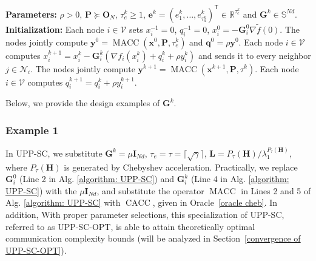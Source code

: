 \documentclass[12pt,draftcls,onecolumn]{IEEEtran}
\renewcommand{\Re}{{\mathbb{R}}}
\newcommand{\bG}{{\mathbf{G}}}
\newcommand{\bI}{{\mathbf{I}}}
\begin{document}
\begin{algorithm}[h]
	\renewcommand{\thealgorithm}{3}
	\caption{UPP-SC}
	\label{algorithm: UPP-SC}               
	\begin{algorithmic}[1]
		\STATE \textbf{Parameters:} $\rho>0$, $\mathbf{P}\succeq\mathbf{O}_N$, $\tau_e^k\geq 1$, $\mathbf{e}^k=(e_1^k,\dots,e_{\tau_a^k}^k)^{\mathsf{T}}\in\Re^{\tau_e^k}$ and $\bG^k\in\mathbb{S}^{Nd}$.
		\STATE \textbf{Initialization:} Each node $i \in\mathcal{V}$ sets $x_i^{-1}=0$, $q_i^{-1}=0$, $x_i^{0}=-\bG_i^0 \nabla \tilde{f}(0)$. The nodes jointly compute ${\mathbf{y}}^0=\operatorname{MACC}(\mathbf{x}^0,\mathbf{P},\tau_e^k)$ and $\mathbf{q}^{0}=\rho {\mathbf{y}}^0$.
			\STATE Each node $i \in \mathcal{V}$ computes $x_i^{k+1} = x_i^k -\bG_i^k (\nabla f_i(x_i^{k}) + q_i^{k} + \rho y_i^{k})$ and sends it to every neighbor $j \in \mathcal{N}_i$.
			\STATE The nodes jointly compute ${\mathbf{y}}^{k+1}=\operatorname{MACC}(\mathbf{x}^{k+1},\mathbf{P},\tau^k)$.
			\STATE Each node $i \in \mathcal{V}$ computes $q_i^{k+1} = q_i^{k} + \rho y_i^{k+1}.$\\
		\ENDFOR
	\end{algorithmic}
\end{algorithm}


Below, we provide the design examples of $\mathbf{G}^k$.

\subsubsection*{Example 1} In UPP-SC, we substitute $\mathbf{G}^k = \mu\mathbf{I}_{Nd}$, $\tau_e=\tau=\lceil \sqrt{\gamma}\rceil$, $\mathbf{L}=P_{\tau}(\mathbf{H})/\lambda_1^{P_{\tau}(\mathbf{H})}$, where $P_{\tau}(\mathbf{H})$ is generated by Chebyshev acceleration. Practically, we replace $\bG_i^0$ (Line 2 in Alg. \ref{algorithm: UPP-SC}) and $\bG_i^k$ (Line 4 in Alg. \ref{algorithm: UPP-SC}) with the $\mu\bI_{Nd}$, and substitute the operator $\operatorname{MACC}$ in Lines 2 and 5 of Alg. \ref{algorithm: UPP-SC} with $\operatorname{CACC}$, given in Oracle~\ref{oracle cheb}. In addition, With proper parameter selections, this specialization of UPP-SC, referred to as UPP-SC-OPT, is able to attain theoretically optimal communication complexity bounds (will be analyzed in Section~\ref{convergence of UPP-SC-OPT}).
\end{document}
